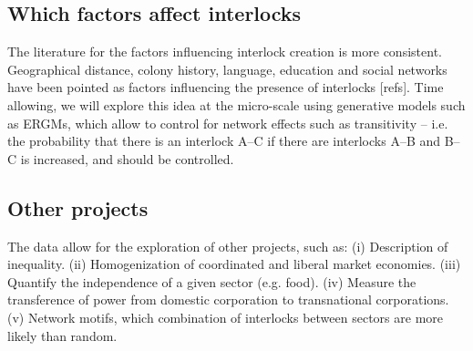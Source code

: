\subsection{Which factors affect interlocks}
\label{sec:factors}
The literature for the factors influencing interlock creation is more consistent.
Geographical distance, colony history, language, education and social networks have been pointed as factors
influencing the presence of interlocks [refs].
Time allowing, we will explore this idea at the micro-scale using generative models such as ERGMs,
which allow to control for network effects such as transitivity -- i.e. the probability that there is an interlock A--C if there are interlocks A--B and B--C is increased, and should be controlled.


\subsection{Other projects}
The data allow for the exploration of other projects, such as:
(i) Description of inequality.
(ii) Homogenization of coordinated and liberal market economies.
(iii) Quantify the independence of a given sector (e.g. food).
(iv) Measure the transference of power from domestic corporation to transnational corporations.
(v) Network motifs, which combination of interlocks between sectors are more likely than random.

